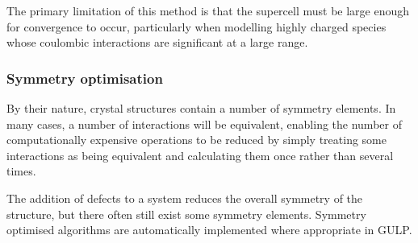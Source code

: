 The primary limitation of this method is that the supercell must be large enough for convergence to occur, particularly when modelling highly charged species whose coulombic interactions are significant at a large range.

\subsubsection{Symmetry optimisation}
By their nature, crystal structures contain a number of symmetry elements.
In many cases, a number of interactions will be equivalent, enabling the number of computationally expensive operations to be reduced by simply treating some interactions as being equivalent and calculating them once rather than several times.

The addition of defects to a system reduces the overall symmetry of the structure, but there often still exist some symmetry elements.
Symmetry optimised algorithms are automatically implemented where appropriate in GULP.

\newpage

